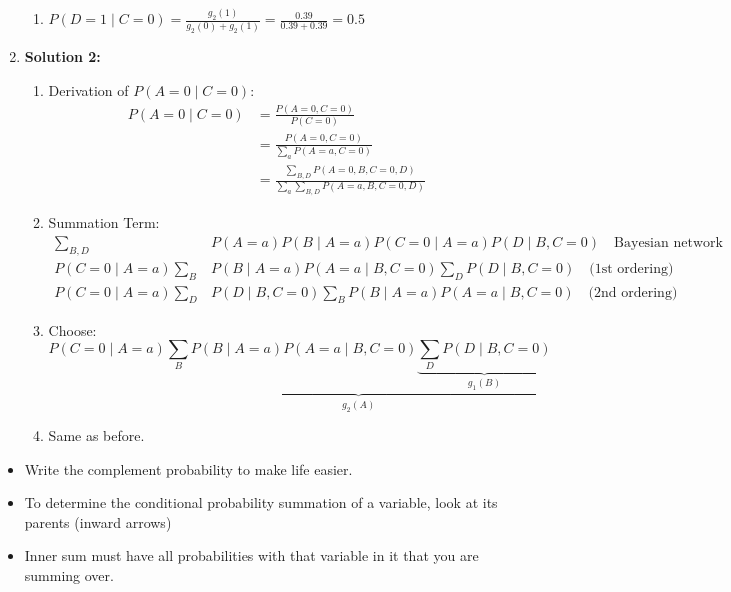 \begin{example}
\begin{enumerate}
\begin{enumerate}
            \item \( P(D=1 \mid C=0) = \frac{g_2(1)}{g_2(0) + g_2(1)} = \frac{0.39}{0.39 + 0.39} = 0.5 \)
        \end{enumerate}   
        \item \textbf{Solution 2:}
        \begin{enumerate}
            \item Derivation of \( P(A=0 \mid C=0) \):
            \begin{align*}
                P(A=0 \mid C=0) &= \frac{P(A=0,C=0)}{P(C=0)} \\
                &= \frac{P(A=0,C=0)}{\sum_a P(A=a,C=0)} \\
                &= \frac{\sum_{B,D} P(A=0,B,C=0,D)}{\sum_a \sum_{B,D} P(A=a,B,C=0,D)}
            \end{align*}
            \item Summation Term:
            \begin{align*}
                \sum_{B,D} & P(A=a) P(B \mid A=a) P(C=0 \mid A=a) P(D \mid B,C=0) \quad \text{Bayesian network} \\
                P(C=0 \mid A=a) \sum_B & P(B \mid A=a) P(A=a \mid B,C=0) \sum_D P(D \mid B,C=0) \quad \text{(1st ordering)} \\
                P(C=0 \mid A=a) \sum_D & P(D \mid B,C=0) \sum_B P(B \mid A=a) P(A=a \mid B,C=0) \quad \text{(2nd ordering)}
            \end{align*}
            \item Choose:
            \[
            P(C=0 \mid A=a) \underbrace{\sum_B P(B \mid A=a) P(A=a \mid B,C=0) \underbrace{\sum_D P(D \mid B,C=0)}_{g_1(B)}}_{g_2(A)}
            \]
            \item Same as before.
        \end{enumerate}     
    \end{enumerate}
\end{example}

\begin{warning}
    \begin{itemize}
        \item Write the complement probability to make life easier.
        \item To determine the conditional probability summation of a variable, look at its parents (inward arrows)
        \item Inner sum must have all probabilities with that variable in it that you are summing over. 
    \end{itemize}
\end{warning}
\newpage

